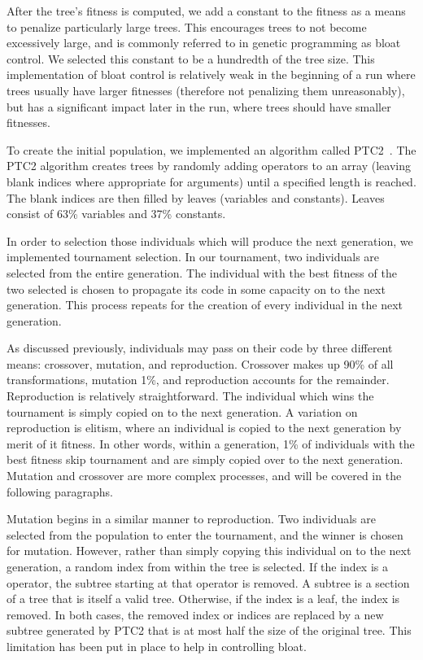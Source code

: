 \documentclass[12pt]{article}
\begin{document}
After the tree's fitness is computed, we add a constant to the fitness as a means to penalize particularly large trees. This encourages trees to not become excessively large, and is commonly referred to in genetic programming as bloat control. We selected this constant to be a hundredth of the tree size. This implementation of bloat control is relatively weak in the beginning of a run where trees usually have larger fitnesses (therefore not penalizing them unreasonably), but has a significant impact later in the run, where trees should have smaller fitnesses.

To create the initial population, we implemented an algorithm called PTC2~\cite{Luke2013Metaheuristics}. The PTC2 algorithm creates trees by randomly adding operators to an array (leaving blank indices where appropriate for arguments) until a specified length is reached. The blank indices are then filled by leaves (variables and constants). Leaves consist of 63\% variables and 37\% constants.

In order to selection those individuals which will produce the next generation, we  implemented tournament selection. In our tournament, two individuals are selected from the entire generation. The individual with the best fitness of the two selected is chosen to propagate its code in some capacity on to the next generation. This process repeats for the creation of every individual in the next generation.

As discussed previously, individuals may pass on their code by three different means: crossover, mutation, and reproduction. Crossover makes up 90\% of all transformations, mutation 1\%, and reproduction accounts for the remainder. Reproduction is relatively straightforward. The individual which wins the tournament is simply copied on to the next generation. A variation on reproduction is elitism, where an individual is copied to the next generation by merit of it fitness. In other words, within a generation, 1\% of individuals with the best fitness skip tournament and are simply copied over to the next generation. Mutation and crossover are more complex processes, and will be covered in the following paragraphs.

Mutation begins in a similar manner to reproduction. Two individuals are selected from the population to enter the tournament, and the winner is chosen for mutation. However, rather than simply copying this individual on to the next generation, a random index from within the tree is selected. If the index is a operator, the subtree starting at that operator is removed. A subtree is a section of a tree that is itself a valid tree. Otherwise, if the index is a leaf, the index is removed. In both cases, the removed index or indices are replaced by a new subtree generated by PTC2 that is at most half the size of the original tree. This limitation has been put in place to help in controlling bloat.
\end{document}
